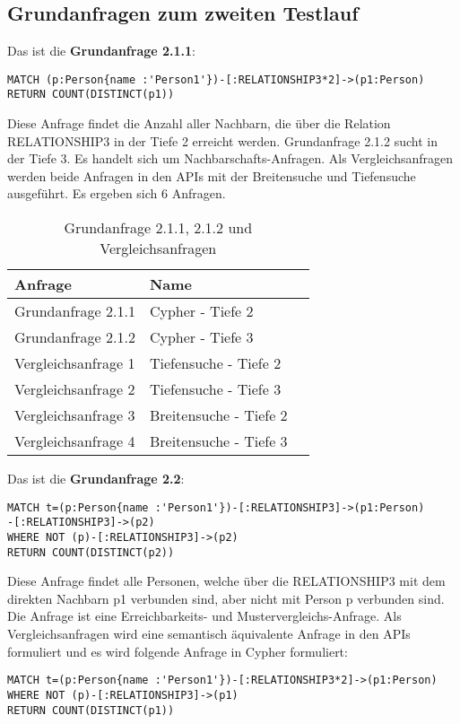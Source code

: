 \subsection{Grundanfragen zum zweiten Testlauf}
Das ist die \textbf{Grundanfrage 2.1.1}: 
\begin{Verbatim}[frame=single]
MATCH (p:Person{name :'Person1'})-[:RELATIONSHIP3*2]->(p1:Person) 
RETURN COUNT(DISTINCT(p1))
\end{Verbatim} 
Diese Anfrage findet die Anzahl aller Nachbarn, die über die Relation RELATIONSHIP3 in der Tiefe 2 erreicht werden. Grundanfrage 2.1.2 sucht in der Tiefe 3. Es handelt sich um Nachbarschafts-Anfragen. Als Vergleichsanfragen werden beide Anfragen in den APIs mit der Breitensuche und Tiefensuche ausgeführt. Es ergeben sich 6 Anfragen.
\FloatBarrier
\begin{table}[h]
	\centering
	\begin{tabular}{ |p{5cm}||p{5cm}|p{3cm}  }
		\hline
		Anfrage& Name\\
		\hline
		Grundanfrage 2.1.1 &  Cypher - Tiefe 2\\
		Grundanfrage 2.1.2 &  Cypher - Tiefe 3\\
		Vergleichsanfrage 1 &  Tiefensuche - Tiefe 2\\
		Vergleichsanfrage 2 &  Tiefensuche - Tiefe 3\\
		Vergleichsanfrage 3 &  Breitensuche - Tiefe 2\\
		Vergleichsanfrage 4 &  Breitensuche - Tiefe 3\\
		\hline
	\end{tabular}
	\caption{Grundanfrage 2.1.1, 2.1.2 und Vergleichsanfragen}
	\label{tab:Intro_Query2_2}
\end{table}
\FloatBarrier
\noindent Das ist die \textbf{Grundanfrage 2.2}: 
\begin{Verbatim}[frame=single]
MATCH t=(p:Person{name :'Person1'})-[:RELATIONSHIP3]->(p1:Person)
-[:RELATIONSHIP3]->(p2)
WHERE NOT (p)-[:RELATIONSHIP3]->(p2) 
RETURN COUNT(DISTINCT(p2))
\end{Verbatim} 
Diese Anfrage findet alle Personen, welche über die RELATIONSHIP3 mit dem direkten Nachbarn  p1 verbunden sind, aber nicht mit Person p verbunden sind. Die Anfrage ist eine Erreichbarkeits- und Mustervergleichs-Anfrage. Als Vergleichsanfragen wird eine semantisch äquivalente Anfrage in den APIs formuliert und es wird folgende Anfrage in Cypher formuliert:
\begin{Verbatim}[frame=single]
MATCH t=(p:Person{name :'Person1'})-[:RELATIONSHIP3*2]->(p1:Person)
WHERE NOT (p)-[:RELATIONSHIP3]->(p1)
RETURN COUNT(DISTINCT(p1))
\end{Verbatim} 
